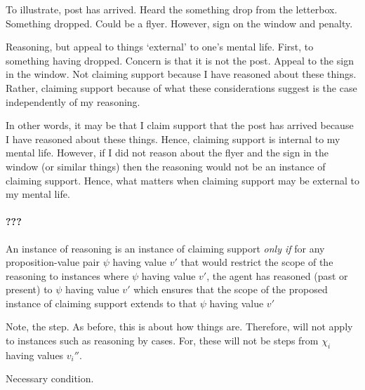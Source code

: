 \begin{note}[Illustration of I/E]
  \color{red}
  To illustrate, post has arrived.
  Heard the something drop from the letterbox.
  Something dropped.
  Could be a flyer.
  However, sign on the window and penalty.

  Reasoning, but appeal to things `external' to one's mental life.
  First, to something having dropped.
  Concern is that it is not the post.
  Appeal to the sign in the window.
  Not claiming support because I have reasoned about these things.
  Rather, claiming support because of what these considerations suggest is the case independently of my reasoning.

  In other words, it may be that I claim support that the post has arrived because I have reasoned about these things.
  Hence, claiming support is internal to my mental life.
  However, if I did not reason about the flyer and the sign in the window (or similar things) then the reasoning would not be an instance of claiming support.
  Hence, what matters when claiming support may be external to my mental life.
\end{note}



\paragraph{???}

\begin{note}
  \color{red}
  An instance of reasoning is an instance of claiming support \emph{only if} for any proposition-value pair \(\psi\) having value \(v'\) that would restrict the scope of the reasoning to instances where \(\psi\) having value \(v'\), the agent has reasoned (past or present) to \(\psi\) having value \(v'\) which ensures that the scope of the proposed instance of claiming support extends to \ep{} that \(\psi\) having value \(v'\)
\end{note}

\begin{note}
  \color{red}
  Note, the step.
  As before, this is about how things are.
  Therefore, will not apply to instances such as reasoning by cases.
  For, these will not be steps from \(\chi_{i}\) having values \(v_{i}''\).

  Necessary condition.
\end{note}

